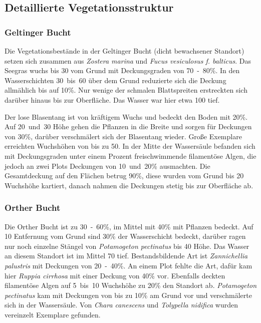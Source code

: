 
\subsection{Detaillierte Vegetationsstruktur}

\subsubsection{Geltinger Bucht}

Die Vegetationsbestände in der Geltinger Bucht (dicht bewachsener Standort) setzen sich zusammen aus \textit{Zostera marina} und \textit{Fucus vesiculosus f. balticus}. Das Seegras wuchs bis \unit{30}{\centi\metre} vom Grund mit Deckungsgraden von \unit{70-80}{\%}. In den Wasserschichten \unit{30 bis 60}{\centi\metre} über dem Grund reduzierte sich die Deckung allmählich bis auf \unit{10}{\%}. Nur wenige der schmalen Blattspreiten erstreckten sich darüber hinaus bis zur Oberfläche. Das Wasser war hier etwa \unit{100}{\centi\metre} tief.

Der lose Blasentang ist von kräftigem Wuchs und bedeckt den Boden mit \unit{20}{\%}. Auf \unit{20 und 30}{\centi\metre} Höhe gehen die Pflanzen in die Breite und sorgen für Deckungen von \unit{30}{\%}, darüber verschmälert sich der Blasentang wieder. Große Exemplare erreichten Wuchshöhen von bis zu \unit{50}{\centi\metre}.
In der Mitte der Wassersäule befanden sich mit Deckungsgraden unter einem Prozent freischwimmende filamentöse Algen, die jedoch an zwei Plots Deckungen von \unit{10 und 20}{\%} ausmachten. Die Gesamtdeckung auf den Flächen betrug \unit{90}{\%}, diese wurden vom Grund bis \unit{20}{\centi\metre} Wuchshöhe kartiert, danach nahmen die Deckungen stetig bis zur Oberfläche ab.

\subsubsection{Orther Bucht}

Die Orther Bucht ist zu \unit{30-60}{\%}, im Mittel mit \unit{40}{\%} mit Pflanzen bedeckt. Auf \unit{10}{\centi\metre} Entfernung vom Grund sind \unit{30}{\%} der Wasserschicht bedeckt, darüber ragen nur noch einzelne Stängel von \textit{Potamogeton pectinatus} bis \unit{40}{\centi\metre} Höhe. Das Wasser an diesem Standort ist im Mittel \unit{70}{\centi\metre} tief. Bestandsbildende Art ist \textit{Zannichellia palustris} mit Deckungen von \unit{20-40}{\%}. An einem Plot fehlte die Art, dafür kam hier \textit{Ruppia cirrhosa} mit einer Deckung von \unit{40}{\%} vor. Ebenfalls deckten filamentöse Algen auf \unit{5 bis 10}{\centi\metre} Wuchshöhe zu \unit{20}{\%} den Standort ab. \textit{Potamogeton pectinatus} kam mit Deckungen von bis zu \unit{10}{\%} am Grund vor und verschmälerte sich in der Wassersäule. Von \textit{Chara canescens} und \textit{Tolypella nidifica} wurden vereinzelt Exemplare gefunden.

